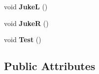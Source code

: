 \begin{DoxyCompactItemize}
\item 
\hypertarget{classMarkX_ad5d6b5f044465562a220ce404e35f6ba}{void {\bfseries \-Juke\-L} ()}\label{classMarkX_ad5d6b5f044465562a220ce404e35f6ba}

\item 
\hypertarget{classMarkX_a2eed152d21cfb3ed949f15087c28b604}{void {\bfseries \-Juke\-R} ()}\label{classMarkX_a2eed152d21cfb3ed949f15087c28b604}

\item 
\hypertarget{classMarkX_a1d52de0e82d838763d9a531181e778e4}{void {\bfseries \-Test} ()}\label{classMarkX_a1d52de0e82d838763d9a531181e778e4}

\end{DoxyCompactItemize}
\subsection*{\-Public \-Attributes}
